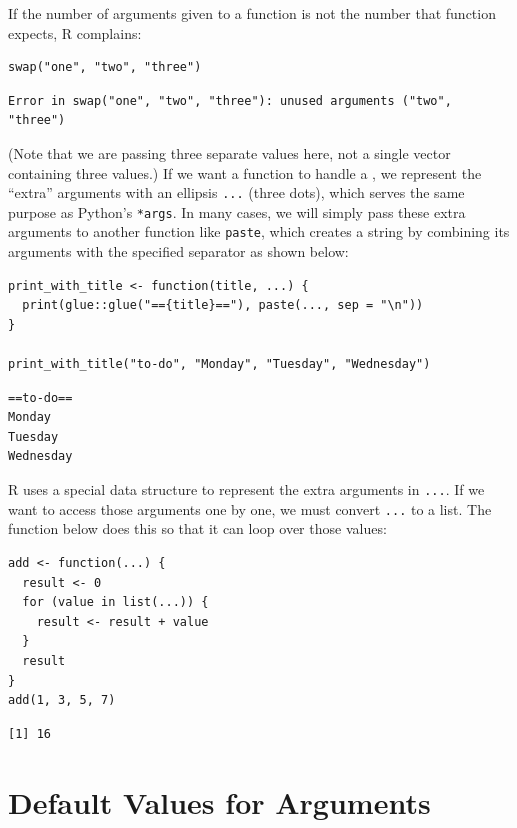 If the number of arguments given to a function is not the number that function expects,
R complains:

\begin{lstlisting}
swap("one", "two", "three")
\end{lstlisting}

\begin{lstlisting}
Error in swap("one", "two", "three"): unused arguments ("two", "three")
\end{lstlisting}

\noindent
(Note that we are passing three separate values here,
not a single vector containing three values.)
If we want a function to handle a ,
we represent the ``extra'' arguments with an ellipsis \texttt{...} (three dots),
which serves the same purpose as Python's \texttt{*args}.
In many cases,
we will simply pass these extra arguments to another function like \texttt{paste},
which creates a string by combining its arguments with the specified separator
as shown below:

\begin{lstlisting}
print_with_title <- function(title, ...) {
  print(glue::glue("=={title}=="), paste(..., sep = "\n"))
}

print_with_title("to-do", "Monday", "Tuesday", "Wednesday")
\end{lstlisting}

\begin{lstlisting}
==to-do==
Monday
Tuesday
Wednesday
\end{lstlisting}

R uses a special data structure to represent the extra arguments in \texttt{...}.
If we want to access those arguments one by one,
we must convert \texttt{...} to a list.
The function below does this so that it can loop over those values:

\begin{lstlisting}
add <- function(...) {
  result <- 0
  for (value in list(...)) {
    result <- result + value
  }
  result
}
add(1, 3, 5, 7)
\end{lstlisting}

\begin{lstlisting}
[1] 16
\end{lstlisting}

\section{Default Values for Arguments}

